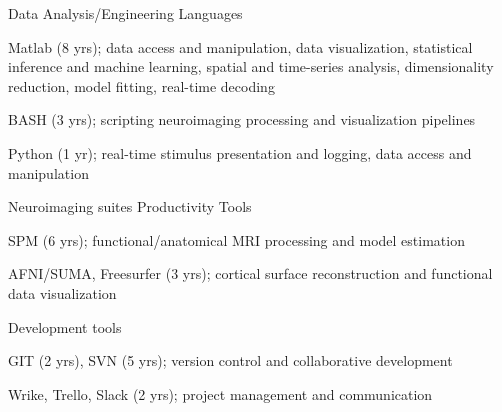 \vspace*{-0.25cm}

\vspace*{0.3cm}

\begin{cventries}

\cventry
    {Data Analysis/Engineering} %
    {Languages} %
    {\vspace*{-0.05cm}}
    {\vspace*{-0.05cm}} %
    {
      \begin{cvitems} %
        \item {Matlab (8 yrs); data access and manipulation, data visualization, statistical inference and machine learning, spatial and time-series analysis, dimensionality reduction, model fitting, real-time decoding}
        \item {BASH (3 yrs); scripting neuroimaging processing and visualization pipelines}
        \item {Python (1 yr); real-time stimulus presentation and logging, data access and manipulation}
      \end{cvitems}
    }
    \vspace*{0.1cm}

\cventry
    {Neuroimaging suites} %
    {Productivity Tools} %
    {\vspace*{-0.05cm}}
    {\vspace*{-0.05cm}} %
    {
      \begin{cvitems} %
        \item {SPM (6 yrs); functional/anatomical MRI processing and model estimation}
        \item {AFNI/SUMA, Freesurfer (3 yrs); cortical surface reconstruction and functional data visualization}
      \end{cvitems}
    }
    \vspace*{-0.2cm}
\cventry
	{Development tools}
	{\vspace*{-0.05cm}}
    {\vspace*{-0.05cm}}
    {\vspace*{-0.05cm}} %
    {
      \begin{cvitems} %
      	\item {GIT (2 yrs), SVN (5 yrs); version control and collaborative development}
      	\item {Wrike, Trello, Slack (2 yrs); project management and communication}
      \end{cvitems}
    }
    \vspace*{-0.2cm}
\end{cventries}

